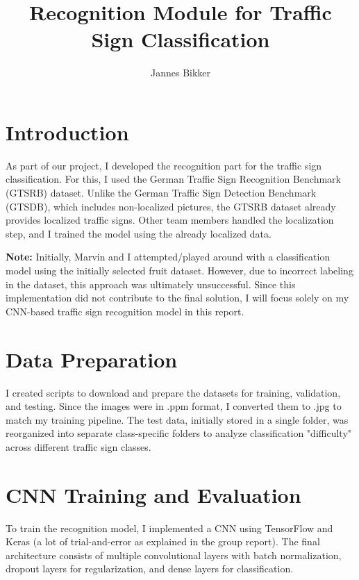 \documentclass[runningheads]{llncs}
\begin{document}
\title{Recognition Module for Traffic Sign Classification}


\author{Jannes Bikker}



\maketitle


\section{Introduction}
As part of our project, I developed the recognition part for the traffic sign classification. For this, I used the German Traffic Sign Recognition Benchmark (GTSRB) dataset. Unlike the German Traffic Sign Detection Benchmark (GTSDB), which includes non-localized pictures, the GTSRB dataset already provides localized traffic signs. Other team members handled the localization step, and I trained the model using the already localized data.

\textbf{Note:} Initially, Marvin and I attempted/played around with a classification model using the initially selected fruit dataset. However, due to incorrect labeling in the dataset, this approach was ultimately unsuccessful. Since this implementation did not contribute to the final solution, I will focus solely on my CNN-based traffic sign recognition model in this report.

\section{Data Preparation}
I created scripts to download and prepare the datasets for training, validation, and testing. Since the images were in .ppm format, I converted them to .jpg to match my training pipeline. The test data, initially stored in a single folder, was reorganized into separate class-specific folders to analyze classification "difficulty" across different traffic sign classes.

\section{CNN Training and Evaluation}
To train the recognition model, I implemented a CNN using TensorFlow and Keras (a lot of trial-and-error as explained in the group report). The final architecture consists of multiple convolutional layers with batch normalization, dropout layers for regularization, and dense layers for classification.
\end{document}
